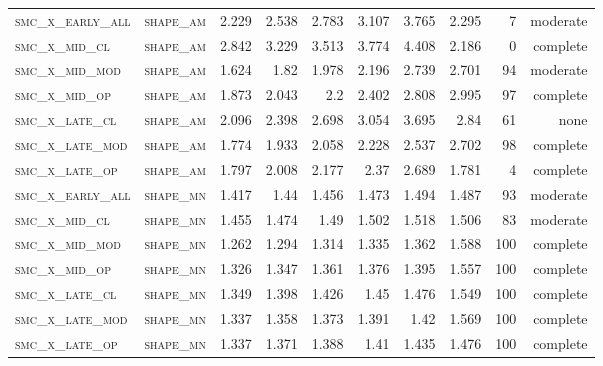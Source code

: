 \begin{landscape}
\begin{center}
\begin{footnotesize}
\begin{longtable}{llrrrrr|rrr}
\textsc{smc\_x\_early\_all} & \textsc{shape\_am }   & 2.229      & 2.538      & 2.783      & 3.107      & 3.765      & 2.295      & 7     & moderate   \\
\textsc{smc\_x\_mid\_cl   } & \textsc{shape\_am }   & 2.842      & 3.229      & 3.513      & 3.774      & 4.408      & 2.186      & 0     & complete   \\
\textsc{smc\_x\_mid\_mod  } & \textsc{shape\_am }   & 1.624      & 1.82       & 1.978      & 2.196      & 2.739      & 2.701      & 94    & moderate   \\
\textsc{smc\_x\_mid\_op   } & \textsc{shape\_am }   & 1.873      & 2.043      & 2.2        & 2.402      & 2.808      & 2.995      & 97    & complete   \\
\textsc{smc\_x\_late\_cl  } & \textsc{shape\_am }   & 2.096      & 2.398      & 2.698      & 3.054      & 3.695      & 2.84       & 61    & none   \\
\textsc{smc\_x\_late\_mod } & \textsc{shape\_am }   & 1.774      & 1.933      & 2.058      & 2.228      & 2.537      & 2.702      & 98    & complete   \\
\textsc{smc\_x\_late\_op  } & \textsc{shape\_am }   & 1.797      & 2.008      & 2.177      & 2.37       & 2.689      & 1.781      & 4     & complete   \\
\textsc{smc\_x\_early\_all} & \textsc{shape\_mn }   & 1.417      & 1.44       & 1.456      & 1.473      & 1.494      & 1.487      & 93    & moderate   \\
\textsc{smc\_x\_mid\_cl   } & \textsc{shape\_mn }   & 1.455      & 1.474      & 1.49       & 1.502      & 1.518      & 1.506      & 83    & moderate   \\
\textsc{smc\_x\_mid\_mod  } & \textsc{shape\_mn }   & 1.262      & 1.294      & 1.314      & 1.335      & 1.362      & 1.588      & 100   & complete   \\
\textsc{smc\_x\_mid\_op   } & \textsc{shape\_mn }   & 1.326      & 1.347      & 1.361      & 1.376      & 1.395      & 1.557      & 100   & complete   \\
\textsc{smc\_x\_late\_cl  } & \textsc{shape\_mn }   & 1.349      & 1.398      & 1.426      & 1.45       & 1.476      & 1.549      & 100   & complete   \\
\textsc{smc\_x\_late\_mod } & \textsc{shape\_mn }   & 1.337      & 1.358      & 1.373      & 1.391      & 1.42       & 1.569      & 100   & complete   \\
\textsc{smc\_x\_late\_op  } & \textsc{shape\_mn }   & 1.337      & 1.371      & 1.388      & 1.41       & 1.435      & 1.476      & 100   & complete   \\

\end{longtable}
\end{footnotesize}
\end{center}
\end{landscape}
